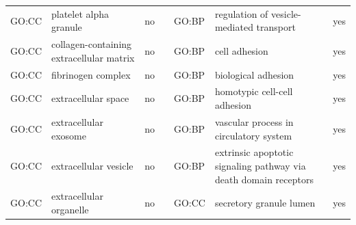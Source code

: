 \begin{longtable}{@{}lp{4cm}lllp{4cm}l@{}}
GO:CC           & platelet alpha granule                                                                                                             & no               &           & GO:BP           & regulation of vesicle-mediated transport                                                                                                                               & yes              \\
GO:CC           & collagen-containing extracellular matrix                                                                                           & no               &           & GO:BP           & cell adhesion                                                                                                                                                          & yes              \\
GO:CC           & fibrinogen complex                                                                                                                 & no               &           & GO:BP           & biological adhesion                                                                                                                                                    & yes              \\
GO:CC           & extracellular space                                                                                                                & no               &           & GO:BP           & homotypic cell-cell adhesion                                                                                                                                           & yes              \\
GO:CC           & extracellular exosome                                                                                                              & no               &           & GO:BP           & vascular process in circulatory system                                                                                                                                 & yes              \\
GO:CC           & extracellular vesicle                                                                                                              & no               &           & GO:BP           & extrinsic apoptotic signaling pathway via death domain receptors                                                                                                       & yes              \\
GO:CC           & extracellular organelle                                                                                                            & no               &           & GO:CC           & secretory granule lumen                                                                                                                                                & yes              \\

\end{longtable}
